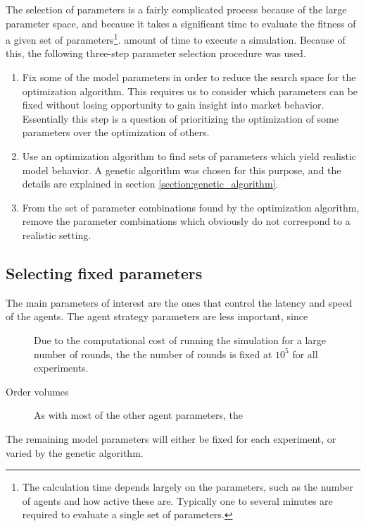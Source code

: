 The selection of parameters is a fairly complicated process because of the large parameter space, and because it takes a significant time to evaluate the fitness of a given set of parameters\footnote{The calculation time depends largely on the parameters, such as the number of agents and how active these are. Typically one to several minutes are required to evaluate a single set of parameters.}. amount of time to execute a simulation. Because of this, the following three-step parameter selection procedure was used.
\begin{enumerate}
	\item Fix some of the model parameters in order to reduce the search space for the optimization algorithm. This requires us to consider which parameters can be fixed without losing opportunity to gain insight into market behavior. Essentially this step is a question of prioritizing the optimization of some parameters over the optimization of others. 
	\item Use an optimization algorithm to find sets of parameters which yield realistic model behavior. A genetic algorithm was chosen for this purpose, and the details are explained in section \ref{section:genetic_algorithm}.
	\item From the set of parameter combinations found by the optimization algorithm, remove the parameter combinations which obviously do not correspond to a realistic setting.
\end{enumerate}

\subsection{Selecting fixed parameters}
The main parameters of interest are the ones that control the latency and speed of the agents. The agent strategy parameters are less important, since 



\begin{description}
	\item [\nrounds] Due to the computational cost of running the simulation for a large number of rounds, the the number of rounds is fixed at $10^5$ for all experiments.
	\item [Order volumes] As with most of the other agent parameters, the 
\end{description}

The remaining model parameters will either be fixed for each experiment, or varied by the genetic algorithm. 

